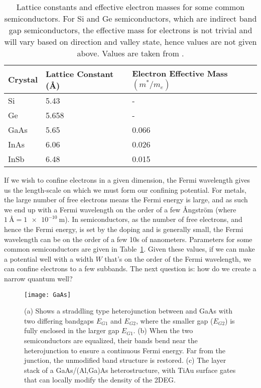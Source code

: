 \begin{table}
  \centering
  \begin{tabular}{|l|l|l|}
   \hline
   Crystal & Lattice Constant (\si{\angstrom}) & Electron Effective Mass$(m^*/m_e)$ \\
   \hline
   Si & 5.43 & - \\
   Ge & 5.658 & - \\
   GaAs & 5.65 & 0.066 \\
   InAs & 6.06 & 0.026 \\
   InSb & 6.48 & 0.015 \\
   \hline
  \end{tabular}
  \caption[Properties of some common semiconductors]
  {Lattice constants and effective electron masses for some common semiconductors. For Si and Ge semiconductors, which are
  indirect band gap semiconductors, the effective mass for electrons is not trivial and will vary based
  on direction and valley state, hence values are not given above. Values are taken from \cite{Kittel2004,InSbParam}.}
  \label{tab:semiprop}
\end{table}

If we wish to confine electrons in a given dimension, the Fermi wavelength gives us the length-scale on which we must form
our confining potential. For metals, the large number of free electrons means the Fermi energy is large, and as such we end up with a
Fermi wavelength on the order of a few Ångström (where $\SI{1}{\angstrom} = \SI{1e-10}{\meter}$). In semiconductors, as
the number of free electrons, and hence the Fermi energy, is set by the doping and is generally small, the Fermi
wavelength can be on the order of a few 10s of nanometers. Parameters for some common semiconductors are given
in Table~\ref{tab:semiprop}. Given these values, if we can make a potential well with a width $W$ that's on
the order of the Fermi wavelength, we can confine electrons to a few subbands. The next question is: how
do we create a narrow quantum well?

\begin{figure}
  \texttt{[image: GaAs]}
  \caption[Band bending in a straddling type heterojunction, and the GaAs/AlGaAs heterostructure]
  {\label{fig:heterostructure}(a) Shows a straddling type heterojunction between  and GaAs with two
  differing bandgaps $E_{G1}$ and $E_{G2}$, where the smaller gap ($E_{G2}$) is fully enclosed in the larger gap $E_{G1}$.
  (b) When the two semiconductors are equalized, their bands bend near the heterojunction to ensure a continuous Fermi energy.
  Far from the junction, the unmodified band structure is restored. (c) The layer stack of a GaAs/(Al,Ga)As heterostructure,
  with TiAu surface gates that can locally modify the density of the 2DEG.}
\end{figure}

